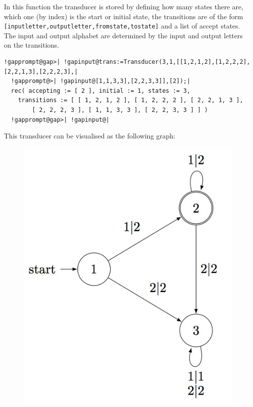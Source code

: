 \documentclass[a4paper,11pt]{report}
\begin{document}
{{{ In this function the transducer is stored by defining how many states there
are, which one (by index) is the start or initial state, the transitions are
of the form \texttt{[inputletter,outputletter,fromstate,tostate]} and a list of accept states. The input and output alphabet are determined by
the input and output letters on the transitions. 
\begin{Verbatim}[commandchars=!@|,fontsize=\small,frame=single,label=Example]
  !gapprompt@gap>| !gapinput@trans:=Transducer(3,1,[[1,2,1,2],[1,2,2,2],[2,2,1,3],[2,2,2,3],|
  !gapprompt@>| !gapinput@[1,1,3,3],[2,2,3,3]],[2]);|
  rec( accepting := [ 2 ], initial := 1, states := 3, 
    transitions := [ [ 1, 2, 1, 2 ], [ 1, 2, 2, 2 ], [ 2, 2, 1, 3 ], 
        [ 2, 2, 2, 3 ], [ 1, 1, 3, 3 ], [ 2, 2, 3, 3 ] ] )
  !gapprompt@gap>| !gapinput@|
\end{Verbatim}
 
      This transducer can be visualised as the following graph:
      \begin{figure}[H] \begin{center} \leavevmode \includegraphics[scale=0.75]{img/trans.jpg} \end{center} \end{figure}
      }

}}
\end{document}
